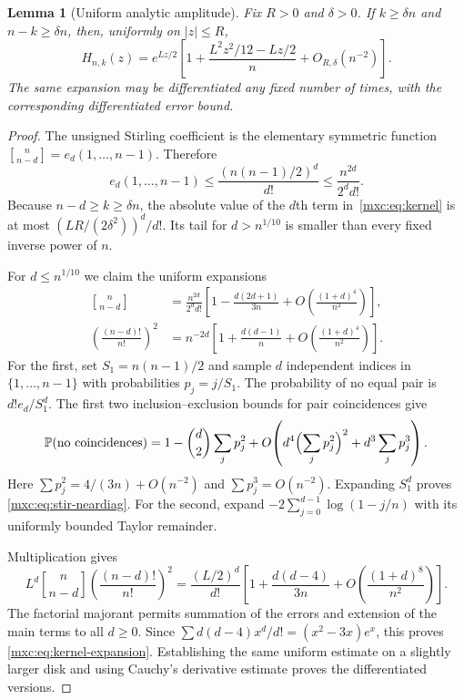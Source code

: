 \documentclass[11pt]{article}
\numberwithin{equation}{section}
\newtheorem{lemma}[theorem]{Lemma}
\theoremstyle{definition}
\theoremstyle{remark}
\newcommand{\Pp}{\mathbb P}
\newcommand{\StirOne}[2]{\genfrac{[}{]}{0pt}{}{#1}{#2}}
\begin{document}
\begin{lemma}[Uniform analytic amplitude]\label{mxc:lem:kernel}
Fix $R>0$ and $\delta>0$. If $k\ge\delta n$ and
$n-k\ge\delta n$, then, uniformly on $|z|\le R$,
\begin{equation}\label{mxc:eq:kernel-expansion}
 H_{n,k}(z)=e^{Lz/2}
 \left[1+\frac{L^2z^2/12-Lz/2}{n}+O_{R,\delta}(n^{-2})\right].
\end{equation}
The same expansion may be differentiated any fixed number of times,
with the corresponding differentiated error bound.
\end{lemma}
\begin{proof}
The unsigned Stirling coefficient is the elementary symmetric function
$\StirOne{n}{n-d}=e_d(1,\ldots,n-1)$. Therefore
\[
 e_d(1,\ldots,n-1)\le\frac{(n(n-1)/2)^d}{d!}
 \le\frac{n^{2d}}{2^d d!}.
\]
Because $n-d\ge k\ge\delta n$, the absolute value of the $d$th
term in~\eqref{mxc:eq:kernel} is at most
$(LR/(2\delta^2))^d/d!$. Its tail for $d>n^{1/10}$ is smaller
than every fixed inverse power of $n$.

For $d\le n^{1/10}$ we claim the uniform expansions
\begin{align}
 \StirOne{n}{n-d}
 &=\frac{n^{2d}}{2^d d!}
   \left[1-\frac{d(2d+1)}{3n}
              +O\!\left(\frac{(1+d)^4}{n^2}\right)\right],
 \label{mxc:eq:stir-neardiag}\\
 \left(\frac{(n-d)!}{n!}\right)^2
 &=n^{-2d}\left[1+\frac{d(d-1)}n
              +O\!\left(\frac{(1+d)^4}{n^2}\right)\right].
 \label{mxc:eq:factorial-neardiag}
\end{align}
For the first, set $S_1=n(n-1)/2$ and sample $d$ independent
indices in $\{1,\ldots,n-1\}$ with probabilities $p_j=j/S_1$.
The probability of no equal pair is $d!e_d/S_1^d$.
The first two inclusion--exclusion bounds for pair coincidences give
\[
 \Pp(\text{no coincidences})
 =1-\binom d2\sum_jp_j^2
   +O\!\left(d^4\Bigl(\sum_jp_j^2\Bigr)^2+d^3\sum_jp_j^3\right).
\]
Here $\sum p_j^2=4/(3n)+O(n^{-2})$ and
$\sum p_j^3=O(n^{-2})$. Expanding $S_1^d$ proves
\eqref{mxc:eq:stir-neardiag}. For the second, expand
$-2\sum_{j=0}^{d-1}\log(1-j/n)$ with its uniformly bounded
Taylor remainder.

Multiplication gives
\[
 L^d\StirOne{n}{n-d}\left(\frac{(n-d)!}{n!}\right)^2
 =\frac{(L/2)^d}{d!}
  \left[1+\frac{d(d-4)}{3n}
           +O\!\left(\frac{(1+d)^8}{n^2}\right)\right].
\]
The factorial majorant permits summation of the errors and extension
of the main terms to all $d\ge0$. Since
$\sum d(d-4)x^d/d!=(x^2-3x)e^x$, this proves
\eqref{mxc:eq:kernel-expansion}. Establishing the same uniform estimate
on a slightly larger disk and using Cauchy's derivative estimate
proves the differentiated versions.
\end{proof}
\end{document}
